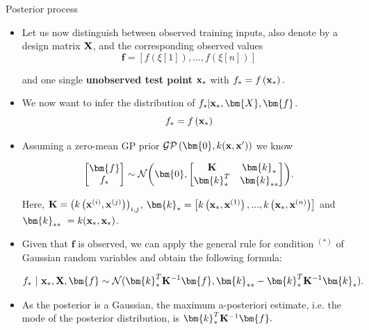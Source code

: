 \documentclass[11pt,compress,t,notes=noshow, xcolor=table]{beamer}
\begin{document}
\begin{vbframe}{Posterior process}

% 
% 

\begin{itemize}
  \item Let us now distinguish between observed training inputs, also denote by a design matrix $\mathbf{X}$, and the corresponding observed values
  $$
    \bm{f} = \left[f\left(\xi[1]\right), ..., f\left(\xi[n]\right)\right]
  $$ 

and one single \textbf{unobserved test point} $\mathbf{x}_*$ with $f_* = f\left(\mathbf{x}_*\right).$

\item We now want to infer the distribution of $f_* | \xv_*, \bm{X}, \bm{f}$.
  $$
    f_* = f\left(\mathbf{x}_*\right)
  $$  
  \item Assuming a zero-mean GP prior $\mathcal{GP}\left(\bm{0}, k(\xv, \xv^\prime)\right)$ we know

$$
\begin{bmatrix}
\bm{f} \\
f_*
\end{bmatrix} \sim  
\mathcal{N}\biggl(\bm{0}, \begin{bmatrix} \Kmat & \bm{k}_* \\ \bm{k}_*^T & \bm{k}_{**}\end{bmatrix}\biggr).
$$

Here, $\mathbf{K} = \left(k\left(\mathbf{x}^{(i)}, \mathbf{x}^{(j)}\right)\right)_{i,j}$, $\bm{k}_* = \left[k\left(\xv_*, \xi[1]\right), ..., k\left(\xv_*, \xi[n]\right)\right]$ and $ \bm{k}_{**}\ = k(\xv_*, \xv_*)$. 

\framebreak 

\item Given that $\bm{f}$ is observed, we can apply the general rule for condition $^{(*)}$ of Gaussian random variables and obtain the following formula: 

\begin{eqnarray*}
f_* ~|~ \xv_*, \Xmat, \bm{f} \sim \mathcal{N}(\bm{k}_{*}^{T}\Kmat^{-1}\bm{f}, \bm{k}_{**} - \bm{k}_*^T \Kmat ^{-1}\bm{k}_*).
\end{eqnarray*}

\item As the posterior is a Gaussian, the maximum a-posteriori estimate, i.e. the mode of the posterior distribution, is $\bm{k}_{*}^{T}\Kmat^{-1}\bm{f}. $
\end{itemize}


\end{vbframe}
\end{document}
